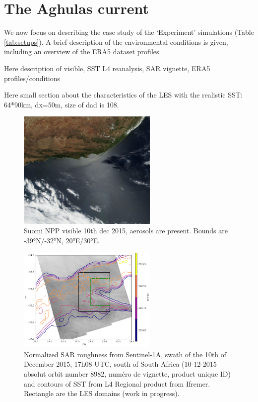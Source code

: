 \documentclass[draft]{agujournal2019} %
\begin{document}
        \section{The Aghulas current}
        \label{section_overview10dec2015}
            

            We now focus on describing the case study of the `Experiment' simulations (Table \ref{tab:setups}). A brief description of the environmental conditions is given, including an overview of the ERA5 dataset profiles.

            Here description of visible, SST L4 reanalysis, SAR vignette, ERA5 profiles/conditions

            Here small section about the characteristics of the LES with the realistic SST: 64*90km, dx=50m, size of dad is 108.

            \begin{figure}[h]
				\centering
				\includegraphics[width=0.6\textwidth]{aiguilles_10dec2015.png}
				\caption{Suomi NPP visible 10th dec 2015, aerosols are present. Bounds are -39°N/-32°N, 20°E/30°E.}
				\label{AG_visible}
			\end{figure} 

            \begin{figure}[h]
				\centering
				\includegraphics[width=0.6\textwidth]{SST_and_SAR.png}
				\caption{Normalized SAR roughness from Sentinel-1A, swath of the 10th of December 2015, 17h08 UTC, south of South Africa (10-12-2015 absolut orbit number 8982, numéro de vignette, product unique ID) and contours of SST from L4 Regional product from Ifremer. Rectangle are the LES domains (work in progress).}
				\label{AG_SAR_17h08UTC}
			\end{figure} 
            
\end{document}
